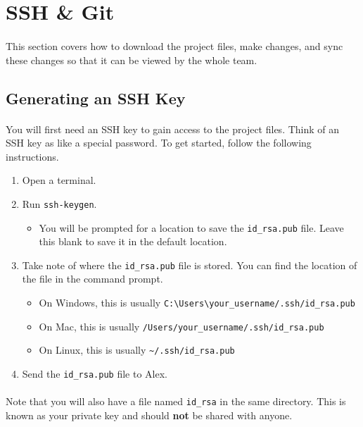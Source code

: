 \documentclass[11pt]{article}
\begin{document}
\section{SSH \& Git}
\paragraph{}
This section covers how to download the project files, make changes, and sync these changes so that it can be viewed by the whole team.
\subsection{Generating an SSH Key}
\paragraph{}
You will first need an SSH key to gain access to the project files. Think of an SSH key as like a special password. To get started, follow the following instructions.
\begin{enumerate}
\item Open a terminal.
\item Run \lstinline{ssh-keygen}.
\begin{itemize}
\item You will be prompted for a location to save the \lstinline{id_rsa.pub} file. Leave this blank to save it in the default location.
\end{itemize}
\item Take note of where the \lstinline{id_rsa.pub} file is stored. You can find the location of the file in the command prompt.
\begin{itemize}
\item On Windows, this is usually \lstinline{C:\Users\your_username/.ssh/id_rsa.pub}
\item On Mac, this is usually \lstinline{/Users/your_username/.ssh/id_rsa.pub}
\item On Linux, this is usually \lstinline{~/.ssh/id_rsa.pub}
\end{itemize}
\item Send the \lstinline{id_rsa.pub} file to Alex.
\end{enumerate}
\paragraph{}
Note that you will also have a file named \lstinline{id_rsa} in the same directory. This is known as your private key and should \textbf{not} be shared with anyone.
\end{document}
